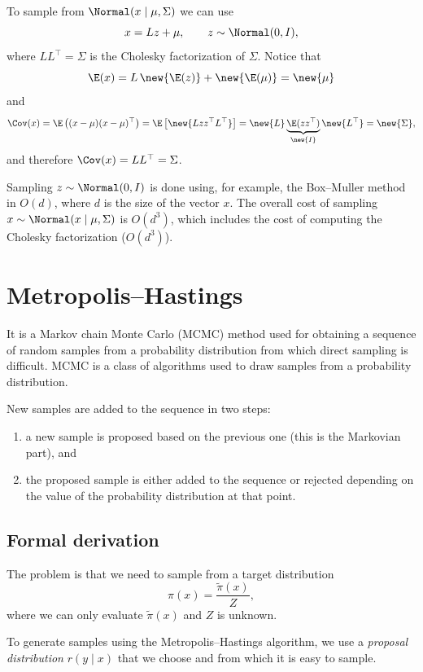 \begin{example}
To sample from $\Normal(x \mid \mu, \Sigma)$ we can use
\[
x = Lz + \mu, \qquad z \sim \Normal(0, I),
\]
where $LL^{\top} = \Sigma$ is the Cholesky factorization of $\Sigma$. Notice that
\[
\E(x) = L\,\new{\E(z)} + \new{\E(\mu)} = \new{\mu}
\]
and
\[
\Cov(x) = \E\left((x - \mu)(x - \mu)^{\top}\right) = \E\left[\new{Lzz^{\top}L^{\top}}\right] = \new{L}\underbrace{\E(zz^{\top})}_{\new{I}}\new{L^{\top}} = \new{\Sigma},
\]
and therefore $\Cov(x) = LL^{\top} = \Sigma$.

Sampling $z \sim \Normal(0, I)$ is done using, for example, the Box--Muller method in $O(d)$, where $d$ is the size of the vector $x$. The overall cost of sampling $x \sim \Normal(x \mid \mu, \Sigma)$ is $O(d^3)$, which includes the cost of computing the Cholesky factorization ($O(d^3)$).
\end{example}

\section{Metropolis--Hastings}
It is a Markov chain Monte Carlo (MCMC) method used for obtaining a sequence of random samples from a probability distribution from which direct sampling is difficult. MCMC is a class of algorithms used to draw samples from a probability distribution.

New samples are added to the sequence in two steps:
\begin{enumerate}[label=(\roman*)]
\item a new sample is proposed based on the previous one (this is the Markovian part), and
\item the proposed sample is either added to the sequence or rejected depending on the value of the probability distribution at that point.
\end{enumerate}

\subsection{Formal derivation}
The problem is that we need to sample from a target distribution
\[
\pi(x) = \frac{\tilde\pi(x)}{Z},
\]
where we can only evaluate $\tilde\pi(x)$ and $Z$ is unknown.

To generate samples using the Metropolis--Hastings algorithm, we use a \emph{proposal distribution} $r(y \mid x)$ that we choose and from which it is easy to sample.

